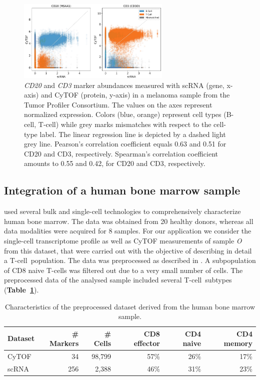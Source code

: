 \begin{figure}[htbp]
    \centering
    \includegraphics[width=0.65\textwidth]{figures/integration/gene_protein_correlation_unicapacity}
    \caption{
      \textit{CD20} and \textit{CD3} marker abundances measured with scRNA (gene, x-axis) and CyTOF (protein, y-axis) in a melanoma sample from the Tumor Profiler Consortium.
      The values on the axes represent normalized expression.
      Colors (blue, orange) represent cell types (B-cell, T-cell) while grey marks mismatches with respect to the cell-type label.
      The linear regression line is depicted by a dashed light grey line.
      Pearson's correlation coefficient equals 0.63 and 0.51 for CD20 and CD3, respectively.
      Spearman's correlation coefficient amounts to 0.55 and 0.42, for CD20 and CD3, respectively.
    }
    \label{fig:tupro-marker-correlation-uni}
\end{figure}


\subsection{Integration of a human bone marrow sample}
\cite{Oetjen2018} used several bulk and single-cell technologies to comprehensively characterize human bone marrow.
The data was obtained from 20 healthy donors, whereas all data modalities were acquired for 8 samples.
For our application we consider the single-cell transcriptome profile as well as CyTOF measurements of sample \textit{O} from this dataset, that were carried out with the objective of describing in detail a T-cell~population.
The data was preprocessed as described in \cite{Oetjen2018}.
A subpopulation of CD8 naive T-cells was filtered out due to a very small number of cells.
The preprocessed data of the analysed sample included several T-cell~subtypes (\textbf{Table~\ref{tbl:oetjen-dataset}}).

\begin{table}[h]
    \centering
    \begin{tabular}{lrrrrr}
    \toprule
    Dataset &  \# Markers &  \# Cells &  CD8 effector &  CD4 naive & CD4 memory  \\
    \midrule
    CyTOF &         34 &   98,799 &       57\% &       26\% & 17\% \\
    scRNA &       256 &     2,388 &       46\% &       31\% & 23\% \\
    \bottomrule
    \end{tabular}
    \caption{
        Characteristics of the preprocessed dataset derived from the human bone marrow sample. 
    }
    \label{tbl:oetjen-dataset}   
\end{table}

